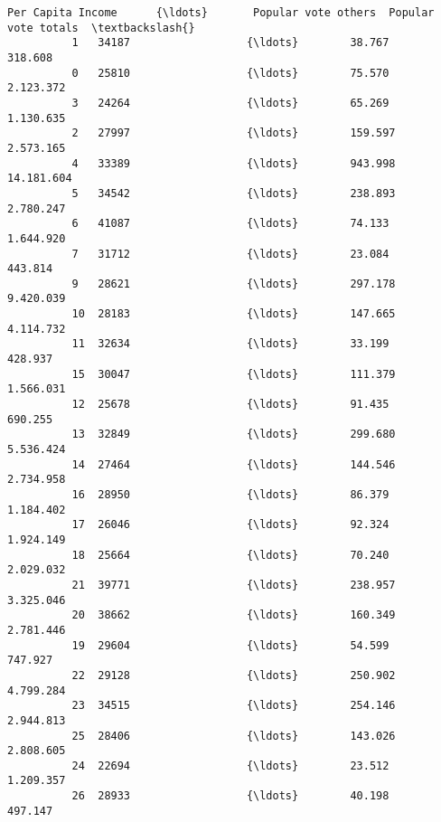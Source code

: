 \documentclass[11pt]{article}
\begin{document}
\begin{Verbatim}[commandchars=\\\{\}]
              Per Capita Income      {\ldots}       Popular vote others  Popular vote totals  \textbackslash{}
          1   34187                  {\ldots}        38.767              318.608               
          0   25810                  {\ldots}        75.570              2.123.372             
          3   24264                  {\ldots}        65.269              1.130.635             
          2   27997                  {\ldots}        159.597             2.573.165             
          4   33389                  {\ldots}        943.998             14.181.604            
          5   34542                  {\ldots}        238.893             2.780.247             
          6   41087                  {\ldots}        74.133              1.644.920             
          7   31712                  {\ldots}        23.084              443.814               
          9   28621                  {\ldots}        297.178             9.420.039             
          10  28183                  {\ldots}        147.665             4.114.732             
          11  32634                  {\ldots}        33.199              428.937               
          15  30047                  {\ldots}        111.379             1.566.031             
          12  25678                  {\ldots}        91.435              690.255               
          13  32849                  {\ldots}        299.680             5.536.424             
          14  27464                  {\ldots}        144.546             2.734.958             
          16  28950                  {\ldots}        86.379              1.184.402             
          17  26046                  {\ldots}        92.324              1.924.149             
          18  25664                  {\ldots}        70.240              2.029.032             
          21  39771                  {\ldots}        238.957             3.325.046             
          20  38662                  {\ldots}        160.349             2.781.446             
          19  29604                  {\ldots}        54.599              747.927               
          22  29128                  {\ldots}        250.902             4.799.284             
          23  34515                  {\ldots}        254.146             2.944.813             
          25  28406                  {\ldots}        143.026             2.808.605             
          24  22694                  {\ldots}        23.512              1.209.357             
          26  28933                  {\ldots}        40.198              497.147               

\end{Verbatim}
\end{document}
